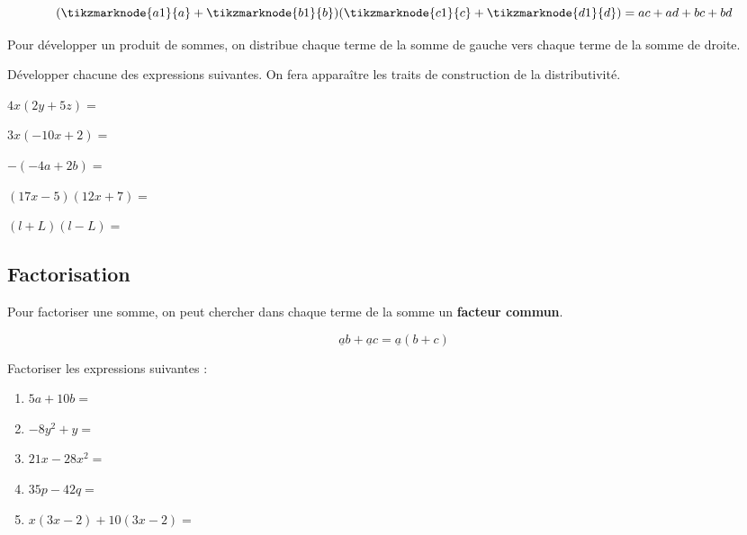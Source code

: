 \documentclass{poly}
\begin{document}
\begin{equation*}
(\tikzmarknode{a1}{a} + \tikzmarknode{b1}{b})(\tikzmarknode{c1}{c} + \tikzmarknode{d1}{d}) =
ac + ad + bc + bd
\end{equation*}
\begin{tcolorbox}
Pour développer un produit de sommes, on \og distribue \fg chaque terme de la somme de gauche vers chaque terme de la somme de droite.
\end{tcolorbox}
\begin{example}
Développer chacune des expressions suivantes. On fera apparaître les traits de construction de la distributivité.
\begin{alphaquestions}
\item $4x(2y + 5z) = $ \answerline
\item $3x(-10x + 2) = $ \answerline
\item $-(-4a + 2b) = $ \answerline
\item $(17x - 5)(12x + 7) = $ \answerline
\item $(l + L)(l - L) = $ \answerline
\end{alphaquestions}
\end{example}

\newpage
\subsection{Factorisation}
\begin{tcolorbox}
Pour factoriser une somme, on peut chercher dans chaque terme de la somme un \textbf{facteur commun}.
\end{tcolorbox}
\begin{equation*}
\underline{a}b + \underline{a}c = \underline{a}(b + c)
\end{equation*}
\begin{example}
Factoriser les expressions suivantes :
\begin{enumerate}[label=\emph{\alph*)}]
\item $5a + 10b =$ \answerline
\item $-8y^2 + y =$ \answerline
\item $21x - 28x^2 =$ \answerline
\item $35p - 42q =$ \answerline
\item $x(3x - 2) + 10(3x - 2) =$ \answerline
\end{enumerate}
\end{example}
\end{document}
